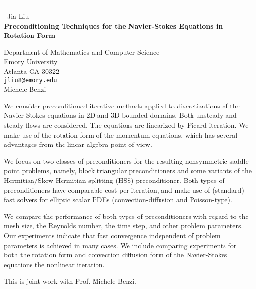 \documentclass{report}
\begin{document}
\begin{center}
\rule{6in}{1pt} \
{\large Jia Liu \\
{\bf Preconditioning Techniques for the Navier-Stokes Equations in Rotation Form}}

Department of Mathematics and Computer Science \\ Emory University \\ Atlanta GA 30322
\\
{\tt jliu8@emory.edu}\\
Michele Benzi\end{center}



We consider preconditioned iterative methods applied to
discretizations of the Navier-Stokes equations in 2D and 3D bounded
domains. Both unsteady and steady flows are considered. The
equations are linearized by Picard iteration. We make use of the
rotation form of the momentum equations, which has several
advantages from the linear algebra point of view.


We focus on two classes of preconditioners for the resulting
nonsymmetric saddle point problems, namely, block triangular
preconditioners and some variants of the Hermitian/Skew-Hermitian
splitting (HSS) preconditioner. Both types of preconditioners have
comparable cost per iteration, and make use of (standard) fast
solvers for elliptic scalar PDEs (convection-diffusion and
Poisson-type).


We compare the performance of both types of preconditioners with
regard to the mesh size, the Reynolds number, the time step, and
other problem parameters. Our experiments indicate that fast
convergence independent of problem parameters is achieved in many
cases. We include comparing experiments for both the rotation form
and convection diffusion form of the Navier-Stokes equations the
nonlinear iteration.


This is joint work with Prof. Michele Benzi.
\end{document}

